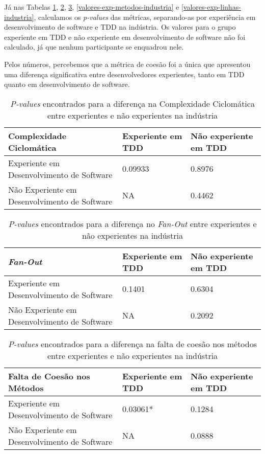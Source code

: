 Já nas Tabelas \ref{valores-exp-cc-industria}, \ref{valores-exp-fanout-industria}, \ref{valores-exp-lcom-industria}, 
\ref{valores-exp-metodos-industria} e \ref{valores-exp-linhas-industria},
calculamos os \textit{p-values} das métricas, separando-as 
por experiência em desenvolvimento de software e TDD na indústria. Os valores para o grupo
experiente em TDD e não experiente em desenvolvimento de software não foi calculado, já que nenhum
participante se enquadrou nele.

Pelos números, percebemos 
que a métrica de coesão foi a única que apresentou uma diferença significativa entre desenvolvedores
experientes, tanto em TDD quanto em desenvolvimento de software.

\begin{table}[h!]
	\centering
	\begin{tabular}{ | p{5cm} | p{5cm} | p{5cm} | }
		\hline
		 Complexidade Ciclomática & Experiente em TDD & Não experiente em TDD \\
		\hline
			Experiente em Desenvolvimento de Software 		& 0.09933	&	0.8976\\
			\hline
			Não Experiente em Desenvolvimento de Software 	& NA		&	0.4462\\
		\hline
	\end{tabular}
	\caption{\textit{P-values} encontrados para a diferença na Complexidade Ciclomática entre experientes e não experientes na indústria}
	\label{valores-exp-cc-industria}
\end{table}

\begin{table}[h!]
	\centering
	\begin{tabular}{ | p{5cm} | p{5cm} | p{5cm} | }
		\hline
		 \textit{Fan-Out} & Experiente em TDD & Não experiente em TDD \\
		\hline
			Experiente em Desenvolvimento de Software 		& 0.1401	&	0.6304\\
			\hline
			Não Experiente em Desenvolvimento de Software 	& NA		&	0.2092\\
		\hline
	\end{tabular}
	\caption{\textit{P-values} encontrados para a diferença no \textit{Fan-Out} entre experientes e não experientes na indústria}
	\label{valores-exp-fanout-industria}
\end{table}

\begin{table}[h!]
	\centering
	\begin{tabular}{ | p{5cm} | p{5cm} | p{5cm} | }
		\hline
		 Falta de Coesão nos Métodos & Experiente em TDD & Não experiente em TDD \\
		\hline
			Experiente em Desenvolvimento de Software 		& \cellcolor[gray]{0.8}0.03061*	&	0.1284\\
			\hline
			Não Experiente em Desenvolvimento de Software 	& NA		&	0.0888\\
		\hline
	\end{tabular}
	\caption{\textit{P-values} encontrados para a diferença na falta de coesão nos métodos entre experientes e não experientes na indústria}
	\label{valores-exp-lcom-industria}
\end{table}

